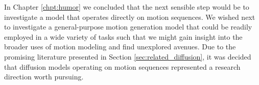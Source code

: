 
In Chapter \ref{chpt:humor} we concluded that the next sensible step would be to investigate a model that operates directly on motion sequences. We wished next to investigate a general-purpose motion generation model that could be readily employed in a wide variety of tasks such that we might gain insight into the broader uses of motion modeling and find unexplored avenues. Due to the promising literature presented in Section \ref{sec:related_diffusion}, it was decided that diffusion models operating on motion sequences represented a research direction worth pursuing.
